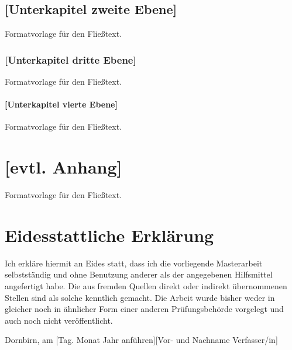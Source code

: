 \documentclass[a4paper,12pt,twoside]{scrreprt}
\begin{document}
\section{[Unterkapitel zweite Ebene]}
Formatvorlage für den Fließtext.

\subsection{[Unterkapitel dritte Ebene]}
Formatvorlage für den Fließtext.

\subsubsection{[Unterkapitel vierte Ebene]}
Formatvorlage für den Fließtext.


\clearpage
{}
{}
\printbibliography

\chapter*{[evtl. Anhang]}  %
Formatvorlage für den Fließtext.


\chapter*{Eidesstattliche Erklärung}
Ich erkläre hiermit an Eides statt, dass ich die vorliegende Masterarbeit selbstständig und ohne Benutzung anderer als der angegebenen Hilfsmittel angefertigt habe. Die aus fremden Quellen direkt oder indirekt übernommenen Stellen sind als solche kenntlich gemacht. Die Arbeit wurde bisher weder in gleicher noch in ähnlicher Form einer anderen Prüfungsbehörde vorgelegt und auch noch nicht veröffentlicht.

\vspace{3cm}
\noindent
Dornbirn, am [Tag. Monat Jahr anführen]\hfill [Vor- und Nachname Verfasser/in]
\end{document}

